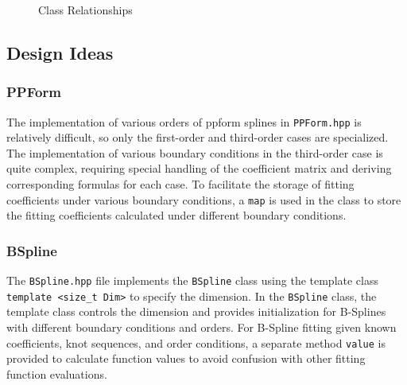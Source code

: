 \documentclass[a4paper]{article}
\begin{document}
\begin{sloppypar}
\begin{figure}[H]
  \renewcommand{\figurename}{Fig.}
  \caption{Class Relationships}
  \label{fig:class_relationships}
\end{figure}

\subsection{Design Ideas}
\subsubsection{PPForm}
The implementation of various orders of ppform splines in \verb|PPForm.hpp| is
relatively difficult, so only the first-order and third-order cases are
specialized. The implementation of various boundary conditions in the
third-order case is quite complex, requiring special handling of the
coefficient matrix and deriving corresponding formulas for each case. To
facilitate the storage of fitting coefficients under various boundary
conditions, a \verb|map| is used in the class to store the fitting coefficients
calculated under different boundary conditions.


\subsubsection{BSpline}
The \verb|BSpline.hpp| file implements the \verb|BSpline| class using the
template class \verb|template <size_t Dim>| to specify the dimension. In the
\verb|BSpline| class, the template class controls the dimension and provides
initialization for B-Splines with different boundary conditions and orders. For
B-Spline fitting given known coefficients, knot sequences, and order
conditions, a separate method \verb|value| is provided to calculate function
values to avoid confusion with other fitting function evaluations.


\end{sloppypar}
\end{document}
